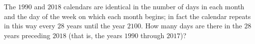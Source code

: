 The $1990$ and $2018$ calendars are identical in the number of days in each month and the day of the week on which each month begins; in fact the calendar repeats in this way every $28$ years until the year $2100$. How many days are there in the $28$ years preceding $2018$ (that is, the years $1990$ through $2017$)?
